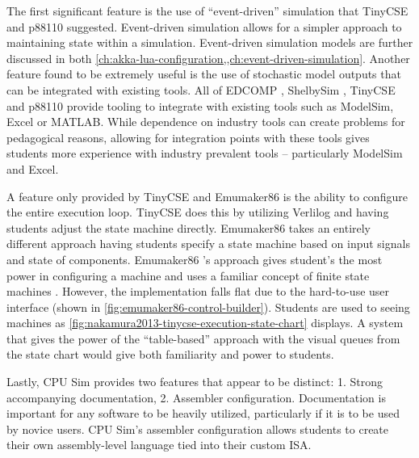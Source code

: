 The first significant feature is the use of ``event-driven'' simulation that TinyCSE \cite{Nakamura2013, McLoughlin2010} and p88110 \cite{Garcia2009} suggested. Event-driven simulation allows for a simpler approach to maintaining state within a simulation. Event-driven simulation models are further discussed in both \cref{ch:akka-lua-configuration,,ch:event-driven-simulation}. Another feature found to be extremely useful is the use of stochastic model outputs that can be integrated with existing tools. All of EDCOMP \cite{Djordjevic2005}, ShelbySim \cite{Tappan2009, Tappan2009-2}, TinyCSE \cite{Nakamura2013, McLoughlin2010} and p88110 \cite{Garcia2009} provide tooling to integrate with existing tools such as ModelSim, Excel or MATLAB. While dependence on industry tools can create problems for pedagogical reasons, allowing for integration points with these tools gives students more experience with industry prevalent tools -- particularly ModelSim and Excel. 

A feature only provided by TinyCSE \cite{Nakamura2013, McLoughlin2010} and Emumaker86 \cite{Black2013} is the ability to configure the entire execution loop. TinyCSE \cite{Nakamura2013,McLoughlin2010} does this by utilizing Verlilog and having students adjust the state machine directly. Emumaker86 \cite{Black2013} takes an entirely different approach having students specify a state machine based on input signals and state of components. Emumaker86 \cite{Black2013}'s approach gives student's the most power in configuring a machine and uses a familiar concept of finite state machines \cite{cec2016}. However, the implementation falls flat due to the hard-to-use user interface (shown in \cref{fig:emumaker86-control-builder}). Students are used to seeing machines as \cref{fig:nakamura2013-tinycse-execution-state-chart} displays. A system that gives the power of the ``table-based'' approach with the visual queues from the state chart would give both familiarity and power to students.

Lastly, CPU Sim \cite{Skrien2001} provides two features that appear to be distinct: 1. Strong accompanying documentation, 2. Assembler configuration. Documentation is important for any software to be heavily utilized, particularly if it is to be used by novice users. CPU Sim's assembler configuration allows students to create their own assembly-level language tied into their custom ISA.  
